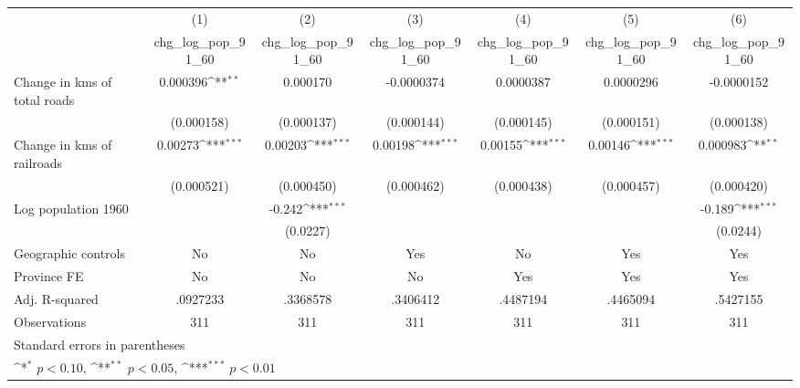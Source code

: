 {
\def\sym#1{\ifmmode^{#1}\else\(^{#1}\)\fi}
\begin{tabular}{l*{6}{c}}
\hline\hline
                    &\multicolumn{1}{c}{(1)}&\multicolumn{1}{c}{(2)}&\multicolumn{1}{c}{(3)}&\multicolumn{1}{c}{(4)}&\multicolumn{1}{c}{(5)}&\multicolumn{1}{c}{(6)}\\
                    &\multicolumn{1}{c}{chg\_log\_pop\_91\_60}&\multicolumn{1}{c}{chg\_log\_pop\_91\_60}&\multicolumn{1}{c}{chg\_log\_pop\_91\_60}&\multicolumn{1}{c}{chg\_log\_pop\_91\_60}&\multicolumn{1}{c}{chg\_log\_pop\_91\_60}&\multicolumn{1}{c}{chg\_log\_pop\_91\_60}\\
\hline
Change in kms of total roads&    0.000396\sym{**} &    0.000170         &  -0.0000374         &   0.0000387         &   0.0000296         &  -0.0000152         \\
                    &  (0.000158)         &  (0.000137)         &  (0.000144)         &  (0.000145)         &  (0.000151)         &  (0.000138)         \\
[1em]
Change in kms of railroads&     0.00273\sym{***}&     0.00203\sym{***}&     0.00198\sym{***}&     0.00155\sym{***}&     0.00146\sym{***}&    0.000983\sym{**} \\
                    &  (0.000521)         &  (0.000450)         &  (0.000462)         &  (0.000438)         &  (0.000457)         &  (0.000420)         \\
[1em]
Log population 1960 &                     &      -0.242\sym{***}&                     &                     &                     &      -0.189\sym{***}\\
                    &                     &    (0.0227)         &                     &                     &                     &    (0.0244)         \\
\hline
Geographic controls &          No         &          No         &         Yes         &          No         &         Yes         &         Yes         \\
Province FE         &          No         &          No         &          No         &         Yes         &         Yes         &         Yes         \\
Adj. R-squared      &    .0927233         &    .3368578         &    .3406412         &    .4487194         &    .4465094         &    .5427155         \\
Observations        &         311         &         311         &         311         &         311         &         311         &         311         \\
\hline\hline
\multicolumn{7}{l}{\footnotesize Standard errors in parentheses}\\
\multicolumn{7}{l}{\footnotesize \sym{*} \(p<0.10\), \sym{**} \(p<0.05\), \sym{***} \(p<0.01\)}\\
\end{tabular}
}
